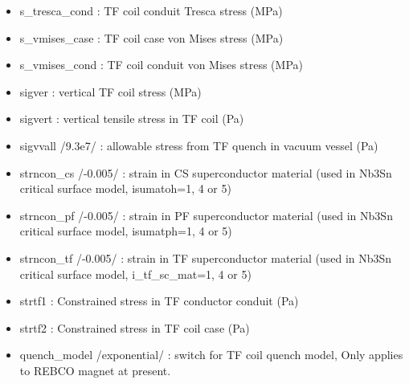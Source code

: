 \documentclass[]{article}
\begin{document}
\begin{itemize}
\item
  s\_tresca\_cond : TF coil conduit Tresca stress (MPa)
\item
  s\_vmises\_case : TF coil case von Mises stress (MPa)
\item
  s\_vmises\_cond : TF coil conduit von Mises stress (MPa)
\item
  sigver : vertical TF coil stress (MPa)
\item
  sigvert : vertical tensile stress in TF coil (Pa)
\item
  sigvvall /9.3e7/ : allowable stress from TF quench in vacuum vessel
  (Pa)
\item
  strncon\_cs /-0.005/ : strain in CS superconductor material (used in
  Nb3Sn critical surface model, isumatoh=1, 4 or 5)
\item
  strncon\_pf /-0.005/ : strain in PF superconductor material (used in
  Nb3Sn critical surface model, isumatph=1, 4 or 5)
\item
  strncon\_tf /-0.005/ : strain in TF superconductor material (used in
  Nb3Sn critical surface model, i\_tf\_sc\_mat=1, 4 or 5)
\item
  strtf1 : Constrained stress in TF conductor conduit (Pa)
\item
  strtf2 : Constrained stress in TF coil case (Pa)
\item
  quench\_model /exponential/ : switch for TF coil quench model, Only
  applies to REBCO magnet at present.


\end{itemize}
\end{document}
